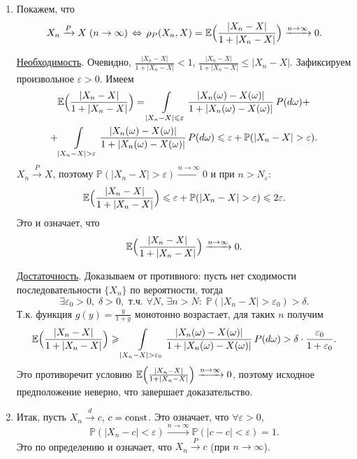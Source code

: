 \begin{solution}
\begin{enumerate}
\item Покажем, что 
$$
X_n\xrightarrow{P} X \; (n\to\infty) \,\Leftrightarrow\, \rho_P(X_n,X)={\mathbb E}\Bigl( \frac{|X_n-X|}{1+|X_n-X|}\Bigr)
\xrightarrow{n\to\infty} 0 . 
$$

\underline{Необходимость}. Очевидно, $\frac{|X_n-X|}{1+|X_n-X|}<1$, $\frac{|X_n-X|}{1+|X_n-X|}\leqslant |X_n-X|$. 
Зафиксируем произвольное $\varepsilon>0$. Имеем 
\begin{multline*}
{\mathbb E}\Bigl( \frac{|X_n-X|}{1+|X_n-X|}\Bigr)=\int\limits_{|X_n-X|\leqslant\varepsilon} 
\frac{|X_n(\omega)-X(\omega)|}{1+|X_n(\omega)-X(\omega)|}\, P(d\omega)+\\
+\int\limits_{|X_n-X|>\varepsilon}
\frac{|X_n(\omega)-X(\omega)|}{1+|X_n(\omega)-X(\omega)|}\, P(d\omega)
\leqslant \varepsilon+{\mathbb P}(|X_n-X|>\varepsilon) . 
\end{multline*}
$X_n\xrightarrow{P} X$, поэтому ${\mathbb P}(|X_n-X|>\varepsilon)\xrightarrow{n\to\infty}0$ и при $n>N_{\varepsilon}$: 
$$
{\mathbb E}\Bigl( \frac{|X_n-X|}{1+|X_n-X|}\Bigr) \leqslant \varepsilon+{\mathbb P}(|X_n-X|>\varepsilon)
\leqslant 2\varepsilon . 
$$
Это и означает, что 
$$
{\mathbb E}\Bigl( \frac{|X_n-X|}{1+|X_n-X|}\Bigr)\xrightarrow{n\to\infty} 0 . 
$$

\underline{Достаточность}. 
Доказываем от противного: пусть нет сходимости последовательности $\{ X_n\}$ по вероятности, тогда 
$$
\exists\varepsilon_0>0, \; \delta>0, \text{ т.ч. } \forall N, \,\exists n>N: \; 
{\mathbb P}(|X_n-X|>\varepsilon_0)>\delta . 
$$
Т.к. функция $g(y)=\frac{y}{1+y}$ монотонно возрастает, для таких $n$ получим 
$$
{\mathbb E}\Bigl( \frac{|X_n-X|}{1+|X_n-X|}\Bigr)\geqslant \int\limits_{|X_n-X|>\varepsilon_0} 
\frac{|X_n(\omega)-X(\omega)|}{1+|X_n(\omega)-X(\omega)|}\, P(d\omega) > \delta\cdot\frac{\varepsilon_0}{1+\varepsilon_0} . 
$$
Это противоречит условию ${\mathbb E}\Bigl( \frac{|X_n-X|}{1+|X_n-X|}\Bigr)\xrightarrow{n\to\infty} 0$, 
поэтому исходное предположение неверно, что завершает доказательство. 

\item 
Итак, пусть $X_n\xrightarrow{d}c$, $c=\mathop{\mathrm{const}}\nolimits$. Это означает, что $\forall \varepsilon>0$, 
$$
{\mathbb P}(|X_n-c|<\varepsilon)\xrightarrow{n\to\infty}{\mathbb P}(|c-c|<\varepsilon)=1 . 
$$
Это по определению и означает, что $X_n\xrightarrow{P}c$ (при $n\to\infty$). 

\end{enumerate}

\end{solution}



